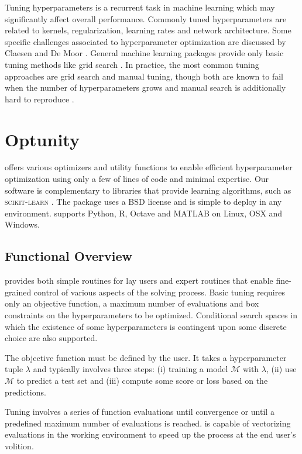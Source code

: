 Tuning hyperparameters is a recurrent task in machine learning which may significantly affect overall performance. Commonly tuned hyperparameters are related to kernels, regularization, learning rates and network architecture. Some specific challenges associated to hyperparameter optimization are discussed by Claesen and De Moor \citep{claesen2015hyperparameter}. General machine learning packages provide only basic tuning methods like grid search \citep{pedregosa2011scikit}. In practice, the most common tuning approaches are grid search and manual tuning, though both are known to fail when the number of hyperparameters grows and manual search is additionally hard to reproduce \citep{bergstra2012random}.

\section{Optunity}
\optunity offers various optimizers and utility functions to enable efficient hyperparameter optimization using only a few of lines of code and minimal expertise. Our software is complementary to libraries that provide learning algorithms, such as \textsc{scikit-learn} \citep{pedregosa2011scikit}. The package uses a BSD license and is simple to deploy in any environment. \optunity supports Python, R, Octave and MATLAB on Linux, OSX and Windows.

\subsection{Functional Overview}
\optunity provides both simple routines for lay users and expert routines that enable fine-grained control of various aspects of the solving process. Basic tuning requires only an objective function, a maximum number of evaluations and box constraints on the hyperparameters to be optimized. Conditional search spaces in which the existence of some hyperparameters is contingent upon some discrete choice are also supported.

The objective function must be defined by the user. It takes a hyperparameter tuple $\lambda$ and typically involves three steps: (i) training a model $\mathcal{M}$ with $\lambda$, (ii) use $\mathcal{M}$ to predict a test set and (iii) compute some score or loss based on the predictions. %

Tuning involves a series of function evaluations until convergence or until a predefined maximum number of evaluations is reached. \optunity is capable of vectorizing evaluations in the working environment to speed up the process at the end user's volition.

